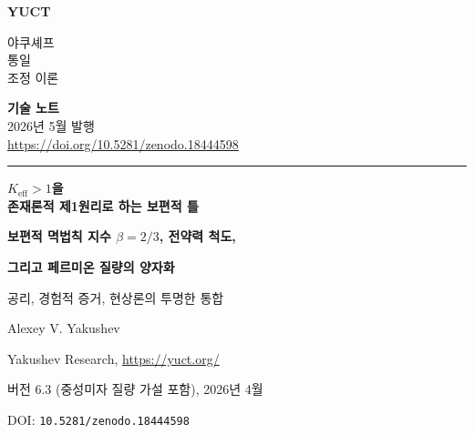 \documentclass[12pt,a4paper]{article}
\newcommand{\makeheader}{%
	\noindent
	\begin{minipage}{0.17\textwidth}
		\raggedright
		{\sffamily\bfseries\color{skyblue}\fontsize{46}{46}\selectfont YUCT}%
	\end{minipage}%
	\hspace{30pt}
	\begin{minipage}{0.32\textwidth}
		\raggedright
		{\sffamily\fontsize{11}{13}\selectfont 야쿠셰프\\ 통일\\ 조정 이론}%
	\end{minipage}%
	\hfill
	\begin{minipage}{0.38\textwidth}
		\raggedleft
		{\sffamily\bfseries 기술 노트}\\ 
		{\sffamily 2026년 5월 발행}\\ 
		{\sffamily\footnotesize \scriptsize\url{https://doi.org/10.5281/zenodo.18444598}}%
	\end{minipage}
	\par\vspace{5pt}
	\noindent\textcolor{gold}{\rule{\textwidth}{1.6pt}}
	\par\vspace{0pt}
}
\begin{document}
	
		\makeheader
		\centering
		\vspace*{1cm}
		
		{\Huge\bfseries \(K_{\mathrm{eff}} > 1\)을\\
			존재론적 제1원리로 하는 보편적 틀\par}
		\vspace{0.3cm}
		{\Large\bfseries 보편적 멱법칙 지수 \(\beta = 2/3\), 전약력 척도,\par}
		\vspace{0.1cm}
		{\Large\bfseries 그리고 페르미온 질량의 양자화\par}
		\vspace{0.5cm}
		{\large 공리, 경험적 증거, 현상론의 투명한 통합\par}
		
		\vspace{1cm}
		
		{\large Alexey V. Yakushev\par}
		\vspace{0.3cm}
		{\normalsize Yakushev Research, \url{https://yuct.org/}\par}
		
		\vspace{1.0cm}
		
		{\normalsize 버전 6.3 (중성미자 질량 가설 포함), 2026년 4월\par}
		\vspace{0.3cm}
		{\normalsize DOI: \texttt{10.5281/zenodo.18444598}\par}
		
		\vfill
		
		\begin{abstract}
			\noindent
			본 논문에서는 야쿠셰프 통일 조정 이론(YUCT)의 최종적인 논리 구조를 제시한다. 모든 주장은 \textbf{공리}(환원 불가능한 요청), \textbf{정리}(공리로부터 증명), \textbf{경험법칙}(견고하게 관측), 또는 \textbf{현상론적 적합}(제약은 있으나 아직 도출되지 않음)으로 분류된다. 협동 효율 \(K_{\mathrm{eff}} > 1\)의 정의와 세 개의 구조 공리로부터, 사전의 중복 인자가 \(q = 2/3\)임을 증명한다. 보편적 지수 \(\beta = 2/3\)는 원자, 생물, 지구물리, 우주론적 척도에 걸친 십여 건의 독립 실험에 의해 확인된 \textbf{경험법칙}이다. \(\beta = 2/3\)로부터 대수적 상수 \(S_{\mathrm{odd}} = 1.2\)와 \(S_{\mathrm{even}} = 0.8\)(닫힌 대수환)을 도출한다. 바일 페르미온의 자유도 수(\(96\))를 사용하여, 단일 인자 \(\xi_W\)를 제외하고 전약력 척도(\(m_W \approx 80.4\) GeV)를 얻는다. 동일한 대수적 구조가 눈금 양자 \(q = (3/2)^{1/3}\)를 제공한다. 아홉 개의 하전 페르미온 질량은 반정수 사다리 위에 있으며, 정밀도는 \(1\%\)보다 좋다(특정 양자수 \(N_f\)는 현재 피팅). 이 사다리의 이산적 구조는 \textbf{반증 가능한 예측}이다: 허용 집합 \(\{m_e q^{N/2}\}\)에 들지 않는 질량을 가진 미래의 입자는 이론을 반증할 것이다. 가장 가벼운 중성미자에 대해 허용되는 질량은 \(\{0.0234, 0.0268, 0.0307, 0.0352, \dots\}\) eV이다. 이론은 조정 가능한 연속 매개변수를 포함하지 않으며, 다른 여러 구체적이고 검증 가능한 예측도 수행한다.
			
			나아가, 페르미온 섹터의 총 협동력을 극대화함으로써 특정 중성미자 양자수 \(N_{\nu} = -125\)(질량 \(\approx 0.023\) eV)를 선택하는 변분 가설을 제안한다. 이 예측은 반증 가능하며, 확인된다면 이론을 강화할 것이다.
		\end{abstract}
		
\end{document}

